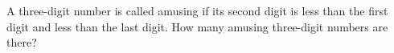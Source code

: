 A three-digit number is called amusing if its second digit is less than the first digit and less than the last digit. How many amusing three-digit numbers are there?
